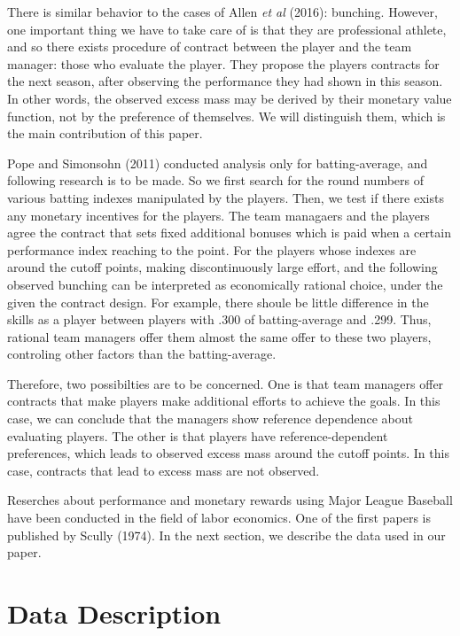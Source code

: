 \documentclass[dvipdfmx, 12pt]{article}
\begin{document}
There is similar behavior to the cases of  Allen \textit{et al} (2016): bunching. However, one important thing we have to take care of is that they are professional athlete, and so there exists procedure of contract between the player and the team manager: those who evaluate the player. They propose the players contracts for the next season, after observing the performance they had shown in this season. In other words, the observed excess mass may be derived by their monetary value function, not by the preference of themselves. We will distinguish them, which is the main contribution of this paper.

Pope and Simonsohn (2011) conducted analysis only for batting-average, and following research is to be made. So we first search for the round numbers of various batting indexes manipulated by the players. Then, we test if there exists any monetary incentives for the players. The team managaers and the players agree the contract that sets fixed additional bonuses which is paid when a certain performance index reaching to the point. For the players whose indexes are around the cutoff points, making discontinuously large effort, and the following observed bunching can be interpreted as economically rational choice, under the given the contract design. For example, there shoule be little difference in the skills as a player between players with .300 of batting-average and .299. Thus, rational team managers offer them almost the same offer to these two players, controling other factors than the batting-average.

Therefore, two possibilties are to be concerned. One is that team managers offer contracts that make players make additional efforts to achieve the goals. In this case, we can conclude that the managers show reference dependence about evaluating players. The other is that players have reference-dependent preferences, which leads to observed excess mass around the cutoff points. In this case, contracts that lead to excess mass are not observed.

Reserches about performance and monetary rewards using Major League Baseball have been conducted in the field of labor economics. One of the first papers is published by Scully (1974). In the next section, we describe the data used in our paper.

\section{Data Description}
\end{document}
